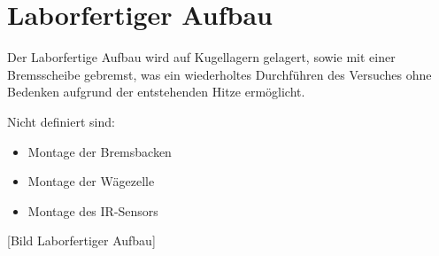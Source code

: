 \section{Laborfertiger Aufbau}

Der Laborfertige Aufbau wird auf Kugellagern gelagert, sowie mit einer Bremsscheibe gebremst, was ein wiederholtes Durchführen des Versuches ohne Bedenken aufgrund der entstehenden Hitze ermöglicht.

Nicht definiert sind:

\begin{itemize}
    \item Montage der Bremsbacken
    \item Montage der Wägezelle
    \item Montage des IR-Sensors
\end{itemize}

[Bild Laborfertiger Aufbau]
